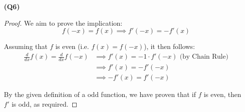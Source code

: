 \documentclass[12pt, a4paper]{article}
\newcommand{\ddx}{\frac{d}{dx}}
\begin{document}
\textbf{(Q6)}

\begin{proof}
    We aim to prove the implication:
    \[
        f(-x) = f(x) \implies f'(-x) = -f'(x)
    \]

    Assuming that $f$ is even (i.e. $f(x) = f(-x)$), it then follows:
    \begin{align*}
        \ddx f(x) = \ddx f(-x) & \implies f'(x) = -1 \cdot f'(-x) \text{ (by Chain Rule)}\\
        & \implies f'(x) = -f'(-x)\\
        & \implies -f'(x) = f'(-x)
    \end{align*}

    By the given definition of a odd function, we have proven that if $f$ is even,
    then $f'$ is odd, as required.
\end{proof}
\end{document}
